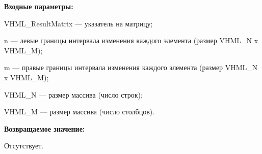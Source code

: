 \textbf{Входные параметры:}
 
VHML\_ResultMatrix --- указатель на матрицу;
 
n --- левые границы интервала изменения каждого элемента (размер VHML\_N x VHML\_M);
 
m --- правые границы интервала изменения каждого элемента (размер VHML\_N x VHML\_M);
 
VHML\_N --- размер массива (число строк);
 
VHML\_M --- размер массива (число столбцов).

\textbf{Возвращаемое значение:}

Отсутствует.